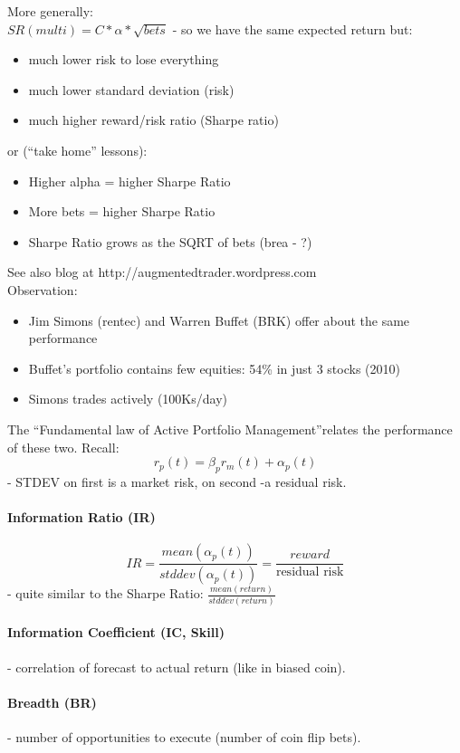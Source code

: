 \documentclass{scrartcl}
\begin{document}
More generally:\\
$SR(multi) = C * \alpha * \sqrt{bets}$ - so we have the same expected return
but:
\begin{itemize}
\item much lower risk to lose everything
\item much lower standard deviation (risk)
\item much higher reward/risk ratio (Sharpe ratio)
\end{itemize}
or (``take home'' lessons):
\begin{itemize}
\item Higher alpha = higher Sharpe Ratio
\item More bets = higher Sharpe Ratio
\item Sharpe Ratio grows as the SQRT of bets (brea - ?)
\end{itemize}
See also blog at http://augmentedtrader.wordpress.com \\
Observation:
\begin{itemize}
\item Jim Simons (rentec) and Warren Buffet (BRK) offer about the same
  performance
\item Buffet's portfolio contains few equities: 54\% in just 3 stocks (2010)
\item Simons trades actively (100Ks/day)
\end{itemize}
The ``Fundamental law of Active Portfolio Management''relates the performance of
these two. Recall:
$$r_p(t) = \beta_pr_m(t) + \alpha_p(t)$$
- STDEV on first is a market risk, on second -a residual risk.

\paragraph{Information Ratio (IR)}
$$IR = \frac{mean(\alpha_p(t))}{stddev(\alpha_p(t))} =
\frac{reward}{\text{residual risk}}$$
- quite similar to the Sharpe Ratio: $\frac{mean(return)}{stddev(return)}$

\paragraph{Information Coefficient (IC, Skill)}
- correlation of forecast to actual return (like in biased coin).

\paragraph{Breadth (BR)}
- number of opportunities to execute (number of coin flip bets).
\end{document}
